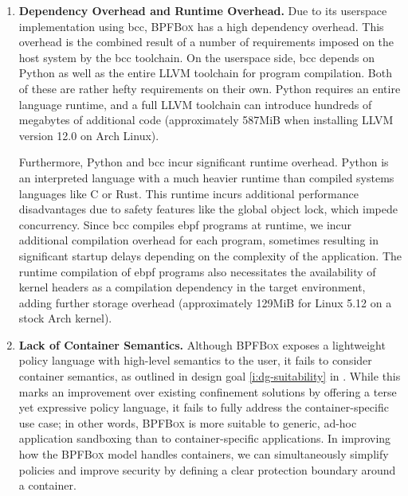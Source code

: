 \documentclass[
  fontsize=12pt,
  titlepage=firstiscover,
  paper=letter,
oneside,
  cleardoublepage=plain,
  parskip=half-,
  DIV=10,
  parindent,
  appendixprefix,
  chapterprefix,
  listof=totoc,
]{scrbook}
\newcommand{\bpfbox}{\textsc{BPFBox}}
\begin{document}
\begin{enumerate}
  \item \textbf{Dependency Overhead and Runtime Overhead.}
    Due to its userspace implementation using bcc, \bpfbox{} has a high dependency
    overhead. This overhead is the combined result of a number of requirements imposed on
    the host system by the bcc toolchain. On the userspace side, bcc depends on Python as
    well as the entire LLVM toolchain for program compilation. Both of these are rather
    hefty requirements on their own. Python requires an entire language runtime, and
    a full LLVM toolchain can introduce hundreds of megabytes of additional code
    (approximately 587MiB when installing LLVM version 12.0 on Arch Linux).

    Furthermore, Python and bcc incur significant runtime overhead. Python is an
    interpreted language with a much heavier runtime than compiled systems languages like
    C or Rust.  This runtime incurs additional performance disadvantages due to safety
    features like the global object lock, which impede concurrency. Since bcc compiles
    \gls{ebpf} programs at runtime, we incur additional compilation overhead for each
    program, sometimes resulting in significant startup delays depending on the complexity
    of the application. The runtime compilation of \gls{ebpf} programs also necessitates
    the availability of kernel headers as a compilation dependency in the target
    environment, adding further storage overhead (approximately 129MiB for Linux
    5.12 on a stock Arch kernel).

  \item \textbf{Lack of Container Semantics.}
    Although \bpfbox{} exposes a lightweight policy language with high-level semantics to
    the user, it fails to consider container semantics, as outlined in design goal
    \ref{i:dg-suitability} in . While this marks an improvement over
    existing confinement solutions by offering a terse yet expressive policy language, it
    fails to fully address the container-specific use case; in other words, \bpfbox{} is
    more suitable to generic, ad-hoc application sandboxing than to container-specific
    applications. In improving how the \bpfbox{} model handles containers, we can
    simultaneously simplify policies and improve security by defining a clear protection
    boundary around a container.


\end{enumerate}
\end{document}
